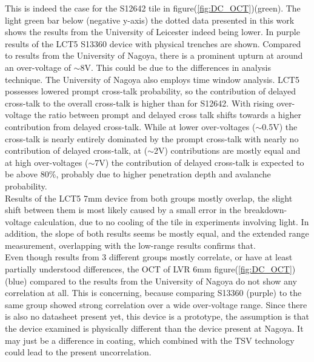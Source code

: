 \documentclass[12pt,article,type=msc,colorback,accentcolor=tud9c]{tudthesis}
\begin{document}
This is indeed the case for the S12642 tile in figure(\ref{fig:DC_OCT})(green). The light green bar below (negative y-axis) the dotted data presented in this work shows the results from the University of Leicester indeed being lower. In purple results of the LCT5 S13360 device with physical trenches are shown. Compared to results from the University of Nagoya, there is a prominent upturn at around an over-voltage of $\sim$8V. This could be due to the differences in analysis technique. The University of Nagoya also employs time window analysis. LCT5 possesses lowered prompt cross-talk probability, so the contribution of delayed cross-talk to the overall cross-talk is higher than for S12642. With rising over-voltage the ratio between prompt and delayed cross talk shifts towards a higher contribution from delayed cross-talk\cite{DelayedOCT}\cite{Yamamoto}. While at lower over-voltages ($\sim$0.5V) the cross-talk is nearly entirely dominated by the prompt cross-talk with nearly no contribution of delayed cross-talk, at ($\sim$2V) contributions are mostly equal and at high over-voltages ($\sim$7V) the contribution of delayed cross-talk is expected to be above 80\%, probably due to higher penetration depth and avalanche probability.\\
Results of the LCT5 7mm device from both groups mostly overlap, the slight shift between them is most likely caused by a small error in the breakdown-voltage calculation, due to no cooling of the tile in experiments involving light. In addition, the slope of both results seems be mostly equal, and the extended range measurement, overlapping with the low-range results confirms that.\\
Even though results from 3 different groups mostly correlate, or have at least partially understood differences, the OCT of LVR 6mm figure(\ref{fig:DC_OCT})(blue) compared to the results from the University of Nagoya do not show any correlation at all. This is concerning, because comparing S13360 (purple) to the same group showed strong correlation over a wide over-voltage range. Since there is also no datasheet present yet, this device is a prototype, the assumption is that the device examined is physically different than the device present at Nagoya. It may just be a difference in coating, which combined with the TSV technology could lead to the present uncorrelation\cite{Yamamoto}.






\end{document}
